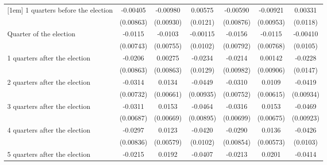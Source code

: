 \begin{table}[!ht]
\begin{tabular}{l*{6}{c}}
[1em]
 1 quarters before the election&    -0.00405         &    -0.00980         &     0.00575         &    -0.00590         &    -0.00921         &     0.00331         \\
                    &   (0.00863)         &   (0.00930)         &    (0.0121)         &   (0.00876)         &   (0.00953)         &    (0.0118)         \\
[1em]
Quarter of the election&     -0.0115         &     -0.0103         &    -0.00115         &     -0.0156\sym{*}  &     -0.0115         &    -0.00410         \\
                    &   (0.00743)         &   (0.00755)         &    (0.0102)         &   (0.00792)         &   (0.00768)         &    (0.0105)         \\
[1em]
 1 quarters after the election&     -0.0206\sym{*}  &     0.00275         &     -0.0234         &     -0.0214\sym{*}  &     0.00142         &     -0.0228         \\
                    &   (0.00863)         &   (0.00863)         &    (0.0129)         &   (0.00982)         &   (0.00906)         &    (0.0147)         \\
[1em]
 2 quarters after the election&     -0.0314\sym{***}&      0.0134\sym{*}  &     -0.0449\sym{***}&     -0.0310\sym{***}&      0.0109         &     -0.0419\sym{***}\\
                    &   (0.00732)         &   (0.00661)         &   (0.00935)         &   (0.00752)         &   (0.00615)         &   (0.00934)         \\
[1em]
 3 quarters after the election&     -0.0311\sym{***}&      0.0153\sym{*}  &     -0.0464\sym{***}&     -0.0316\sym{***}&      0.0153\sym{*}  &     -0.0469\sym{***}\\
                    &   (0.00687)         &   (0.00669)         &   (0.00895)         &   (0.00699)         &   (0.00675)         &   (0.00923)         \\
[1em]
 4 quarters after the election&     -0.0297\sym{***}&      0.0123\sym{*}  &     -0.0420\sym{***}&     -0.0290\sym{***}&      0.0136\sym{*}  &     -0.0426\sym{***}\\
                    &   (0.00836)         &   (0.00579)         &    (0.0102)         &   (0.00854)         &   (0.00573)         &    (0.0103)         \\
[1em]
 5 quarters after the election&     -0.0215\sym{**} &      0.0192         &     -0.0407\sym{**} &     -0.0213\sym{**} &      0.0201         &     -0.0414\sym{**} \\

\end{tabular}
\end{table}
